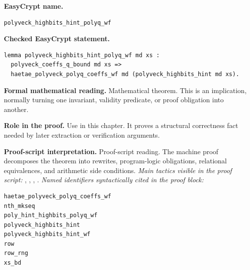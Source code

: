 \begin{formaltheorem}
\noindent\textbf{EasyCrypt name.}
\begin{lstlisting}[language=EasyCrypt,basicstyle=\ttfamily\scriptsize]
polyveck_highbits_hint_polyq_wf
\end{lstlisting}
\noindent\textbf{Checked EasyCrypt statement.}
\begin{lstlisting}[language=EasyCrypt,basicstyle=\ttfamily\scriptsize]
lemma polyveck_highbits_hint_polyq_wf md xs :
  polyveck_coeffs_q_bound md xs =>
  haetae_polyveck_polyq_coeffs_wf md (polyveck_highbits_hint md xs).
\end{lstlisting}
\noindent\textbf{Formal mathematical reading.}
Mathematical theorem. This is an implication, normally turning one invariant, validity predicate, or proof obligation into another.

\noindent\textbf{Role in the proof.}
Use in this chapter. It proves a structural correctness fact needed by later extraction or verification arguments.

\noindent\textbf{Proof-script interpretation.}
Proof-script reading. The machine proof decomposes the theorem into rewrites, program-logic obligations, relational equivalences, and arithmetic side conditions.
\emph{Main tactics visible in the proof script:} , , , .
\emph{Named identifiers syntactically cited in the proof block:}
\begin{lstlisting}[language=EasyCrypt,basicstyle=\ttfamily\scriptsize]
haetae_polyveck_polyq_coeffs_wf
nth_mkseq
poly_hint_highbits_polyq_wf
polyveck_highbits_hint
polyveck_highbits_hint_wf
row
row_rng
xs_bd
\end{lstlisting}

\end{formaltheorem}

